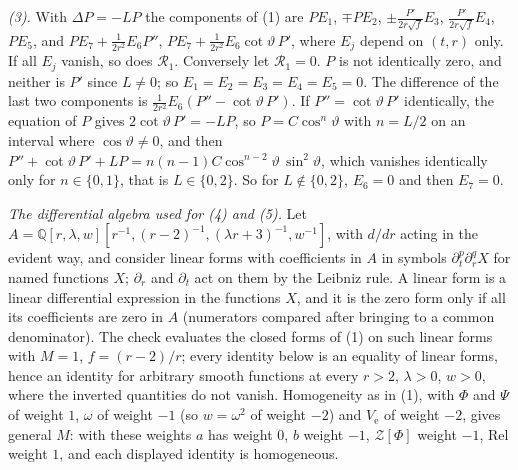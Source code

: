 \emph{(3).} With $\Delta P = -LP$ the components of (1) are $P E_{1}$, $\mp P E_{2}$, $\pm\tfrac{P'}{2r\sqrt f}E_{3}$, $\tfrac{P'}{2r\sqrt f}E_{4}$, $P E_{5}$, and $P E_{7} + \tfrac{1}{2r^{2}}E_{6}P''$, $P E_{7} + \tfrac{1}{2r^{2}}E_{6}\cot\vartheta\,P'$, where $E_{j}$ depend on $(t, r)$ only. If all $E_{j}$ vanish, so does $\mathcal{R}_{1}$. Conversely let $\mathcal{R}_{1} = 0$. $P$ is not identically zero, and neither is $P'$ since $L \neq 0$; so $E_{1} = E_{2} = E_{3} = E_{4} = E_{5} = 0$. The difference of the last two components is $\tfrac{1}{2r^{2}}E_{6}(P'' - \cot\vartheta\,P')$. If $P'' = \cot\vartheta\,P'$ identically, the equation of $P$ gives $2\cot\vartheta\,P' = -LP$, so $P = C\cos^{n}\vartheta$ with $n = L/2$ on an interval where $\cos\vartheta \neq 0$, and then $P'' + \cot\vartheta\,P' + LP = n(n-1)C\cos^{n-2}\vartheta\,\sin^{2}\vartheta$, which vanishes identically only for $n \in \{0, 1\}$, that is $L \in \{0, 2\}$. So for $L \notin \{0, 2\}$, $E_{6} = 0$ and then $E_{7} = 0$.

\emph{The differential algebra used for (4) and (5).} Let $A = \mathbb{Q}[r, \lambda, w][r^{-1}, (r - 2)^{-1}, (\lambda r + 3)^{-1}, w^{-1}]$, with $d/dr$ acting in the evident way, and consider linear forms with coefficients in $A$ in symbols $\partial_{t}^{p}\partial_{r}^{q}X$ for named functions $X$; $\partial_{r}$ and $\partial_{t}$ act on them by the Leibniz rule. A linear form is a linear differential expression in the functions $X$, and it is the zero form only if all its coefficients are zero in $A$ (numerators compared after bringing to a common denominator). The check evaluates the closed forms of (1) on such linear forms with $M = 1$, $f = (r - 2)/r$; every identity below is an equality of linear forms, hence an identity for arbitrary smooth functions at every $r > 2$, $\lambda > 0$, $w > 0$, where the inverted quantities do not vanish. Homogeneity as in (1), with $\Phi$ and $\Psi$ of weight $1$, $\omega$ of weight $-1$ (so $w = \omega^{2}$ of weight $-2$) and $V_{\mathrm{e}}$ of weight $-2$, gives general $M$: with these weights $a$ has weight $0$, $b$ weight $-1$, $\mathcal{Z}[\Phi]$ weight $-1$, $\mathrm{Rel}$ weight $1$, and each displayed identity is homogeneous.

